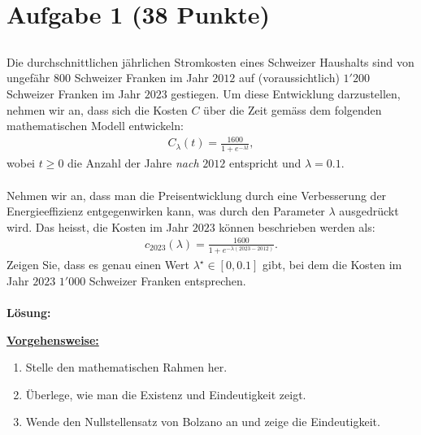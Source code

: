 \vspace{1cm}
\renewcommand{\labelenumi}{\theenumi.}
\section*{Aufgabe 1 (38 Punkte)}
\vspace{0.4cm}
\subsection*{} 
Die durchschnittlichen jährlichen Stromkosten eines Schweizer Haushalts sind von ungefähr $800$ Schweizer Franken im Jahr $2012$ auf (voraussichtlich) $1'200$ Schweizer Franken im Jahr $2023$ gestiegen. Um diese Entwicklung darzustellen, nehmen wir an, dass sich die Kosten $C$ über die Zeit gemäss dem folgenden mathematischen Modell entwickeln:
\begin{align*}
	C_\lambda(t)
	=
	\frac{1600}{1 + e^{-\lambda t}},
\end{align*}
wobei $t \geq 0$ die Anzahl der Jahre \textit{nach} $2012$ entspricht und $\lambda = 0.1$.
\\
\\
Nehmen wir an, dass man die Preisentwicklung durch eine Verbesserung der Energieeffizienz entgegenwirken kann, was durch den Parameter $\lambda$ ausgedrückt wird. Das heisst, die Kosten im Jahr $2023$ können beschrieben werden als:
\begin{align*}
	c_{2023}(\lambda) 
	=
	\frac{1600}{1 + e^{- \lambda (2023 - 2012)}}.
\end{align*}
Zeigen Sie, dass es genau einen Wert $\lambda^\star \in [0,0.1]$ gibt, bei dem die Kosten im Jahr $2023$ $1'000$ Schweizer Franken entsprechen.
\
\\ \\
\textbf{Lösung:}
\begin{mdframed}
\underline{\textbf{Vorgehensweise:}}
\renewcommand{\labelenumi}{\theenumi.}
\begin{enumerate}
\item 
Stelle den mathematischen Rahmen her.
\item
Überlege, wie man die Existenz und Eindeutigkeit zeigt.
\item
Wende den Nullstellensatz von Bolzano an und zeige die Eindeutigkeit. 
\end{enumerate}
\end{mdframed}
